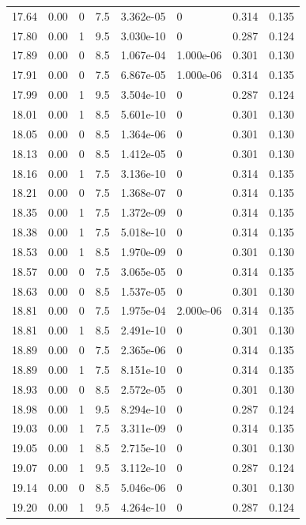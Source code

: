 \documentclass[preview]{standalone}
\begin{document}
{{{{{\begin{tabular}{L{1.2cm}C{1.2cm} C{0.3cm}C{0.5cm} C{1.4cm}C{1.4cm} C{1.4cm}C{1.4cm}}
  17.64  &  0.00  & 0     & 7.5 &  3.362e-05  & 0  & 0.314 &  0.135   \\ 
  17.80  &  0.00  & 1     & 9.5 &  3.030e-10  & 0  & 0.287 &  0.124   \\ 
  17.89  &  0.00  & 0     & 8.5 &  1.067e-04  & 1.000e-06  & 0.301 &  0.130   \\ 
  17.91  &  0.00  & 0     & 7.5 &  6.867e-05  & 1.000e-06  & 0.314 &  0.135   \\ 
  17.99  &  0.00  & 1     & 9.5 &  3.504e-10  & 0  & 0.287 &  0.124   \\ 
  18.01  &  0.00  & 1     & 8.5 &  5.601e-10  & 0  & 0.301 &  0.130   \\ 
  18.05  &  0.00  & 0     & 8.5 &  1.364e-06  & 0  & 0.301 &  0.130   \\ 
  18.13  &  0.00  & 0     & 8.5 &  1.412e-05  & 0  & 0.301 &  0.130   \\ 
  18.16  &  0.00  & 1     & 7.5 &  3.136e-10  & 0  & 0.314 &  0.135   \\ 
  18.21  &  0.00  & 0     & 7.5 &  1.368e-07  & 0  & 0.314 &  0.135   \\ 
  18.35  &  0.00  & 1     & 7.5 &  1.372e-09  & 0  & 0.314 &  0.135   \\ 
  18.38  &  0.00  & 1     & 7.5 &  5.018e-10  & 0  & 0.314 &  0.135   \\ 
  18.53  &  0.00  & 1     & 8.5 &  1.970e-09  & 0  & 0.301 &  0.130   \\ 
  18.57  &  0.00  & 0     & 7.5 &  3.065e-05  & 0  & 0.314 &  0.135   \\ 
  18.63  &  0.00  & 0     & 8.5 &  1.537e-05  & 0  & 0.301 &  0.130   \\ 
  18.81  &  0.00  & 0     & 7.5 &  1.975e-04  & 2.000e-06  & 0.314 &  0.135   \\ 
  18.81  &  0.00  & 1     & 8.5 &  2.491e-10  & 0  & 0.301 &  0.130   \\ 
  18.89  &  0.00  & 0     & 7.5 &  2.365e-06  & 0  & 0.314 &  0.135   \\ 
  18.89  &  0.00  & 1     & 7.5 &  8.151e-10  & 0  & 0.314 &  0.135   \\ 
  18.93  &  0.00  & 0     & 8.5 &  2.572e-05  & 0  & 0.301 &  0.130   \\ 
  18.98  &  0.00  & 1     & 9.5 &  8.294e-10  & 0  & 0.287 &  0.124   \\ 
  19.03  &  0.00  & 1     & 7.5 &  3.311e-09  & 0  & 0.314 &  0.135   \\ 
  19.05  &  0.00  & 1     & 8.5 &  2.715e-10  & 0  & 0.301 &  0.130   \\ 
  19.07  &  0.00  & 1     & 9.5 &  3.112e-10  & 0  & 0.287 &  0.124   \\ 
  19.14  &  0.00  & 0     & 8.5 &  5.046e-06  & 0  & 0.301 &  0.130   \\ 
  19.20  &  0.00  & 1     & 9.5 &  4.264e-10  & 0  & 0.287 &  0.124   \\ 
\hline 
\end{tabular} 

}}}}}
\end{document}
